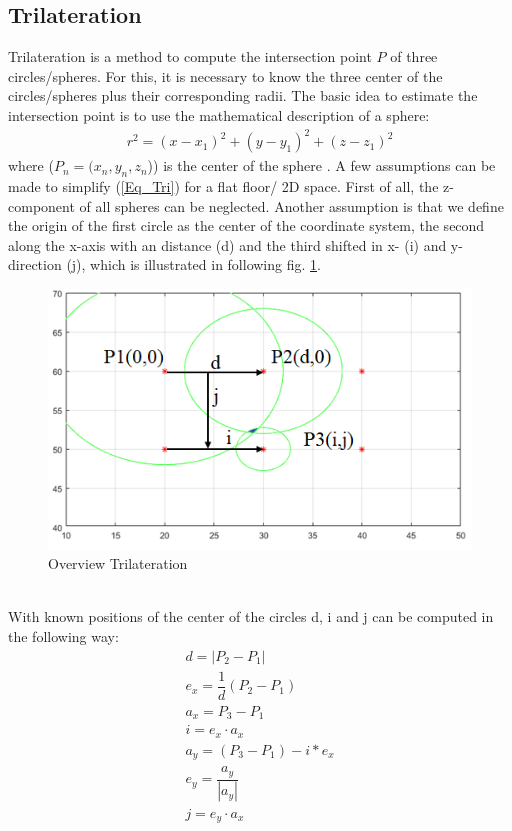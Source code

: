 \subsection{Trilateration}
Trilateration is a method to compute the intersection point $P$ of three circles/spheres. For this, it is necessary to know the three center of the circles/spheres plus their corresponding radii. The basic idea to estimate the intersection point is to use the mathematical description of a sphere:
\begin{align}\label{Eq_Tri}
r^2 = (x-x_1)^2 + (y-y_1)^2 + (z-z_1)^2  
\end{align} 
where ($P_n=(x_n,y_n,z_n$)) is the center of the sphere \cite{Cotera.2016}. A few assumptions can be made to simplify (\ref{Eq_Tri}) for a flat floor/ 2D space. First of all, the z-component of all spheres can be neglected. Another assumption is that we define the origin of the first circle as the center of the coordinate system, the second along the x-axis with an distance (d) and the third shifted in x- (i) and y-direction (j), which is illustrated in following fig. \ref{Tri_1}.\\ 
\begin{figure}[!htbp]
 \centering
 \includegraphics[width = 13cm]{Pictures/Trilateration_1}
 \caption{Overview Trilateration}
 \label{Tri_1}
 \end{figure}\\ 
With known positions of the center of the circles d, i and j can be computed in the following way\cite{Cotera.2016}:
\begin{align}
d = |P_2 - P_1| \\ 
e_x = \dfrac{1}{d}(P_2 - P_1) \\
a_x = P_3 - P_1 \\
i = e_x \cdot a_x \\
a_y = (P_3 - P_1) - i * e_x \\
e_y = \dfrac{a_y}{|a_y|} \\
j = e_y \cdot a_x
\end{align}
